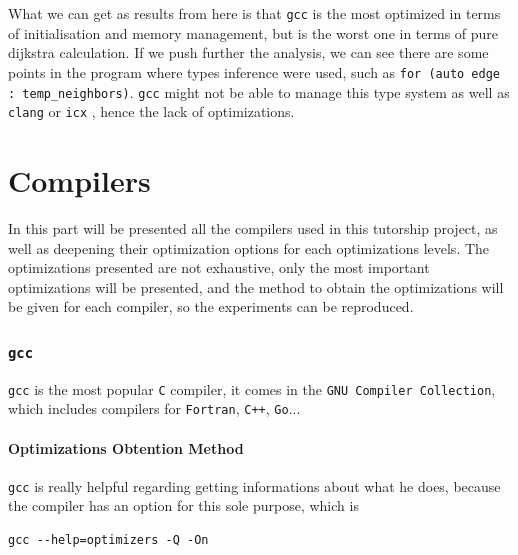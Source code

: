 \documentclass{rapport}
\newcommand{\gcc}{\texttt{gcc} }
\newcommand{\icx}{\texttt{icx} }
\newcommand{\clang}{\texttt{clang} }
\begin{document}
What we can get as results from here is that \gcc is the most optimized in terms of initialisation and memory management, but is the worst one in terms 
of pure dijkstra calculation. \newline
If we push further the analysis, we can see there are some points in the program where types inference were used, such as \texttt{for (auto edge : temp\_neighbors)}. 
\gcc might not be able to manage this type system as well as \clang or \icx, hence the lack of optimizations.

\clearpage
\part{Compilers}
In this part will be presented all the compilers used in this tutorship project, as well as deepening their optimization options for each optimizations levels.
\newline
The optimizations presented are not exhaustive, only the most important optimizations will be presented, and the method to obtain the optimizations will be given
for each compiler, so the experiments can be reproduced.




\section{\gcc}
\gcc is the most popular \texttt{C} compiler, it comes in the \texttt{GNU Compiler Collection}, which includes compilers for \texttt{Fortran}, \texttt{C++}, \texttt{Go}...

\subsection*{Optimizations Obtention Method}
\gcc is really helpful regarding getting informations about what he does, because the compiler has an option for this sole purpose, which is
\begin{verbatim}
gcc --help=optimizers -Q -On
\end{verbatim}
\end{document}
